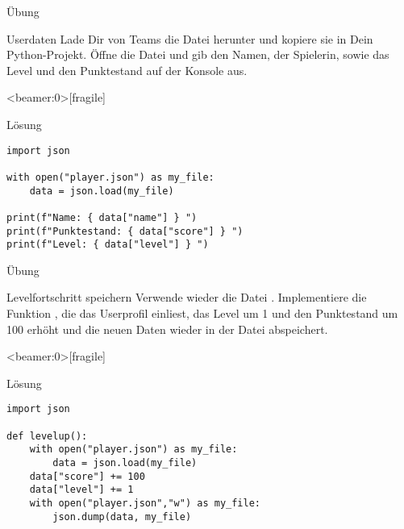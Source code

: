 \begin{frame}{Übung}
\begin{block}{Userdaten}
\vspace{2pt}
Lade Dir von Teams die Datei  herunter und kopiere sie in Dein Python-Projekt. 
Öffne die Datei und gib den Namen, der Spielerin, sowie das Level und den Punktestand auf der Konsole aus. 
\end{block}
\end{frame}



\begin{frame}<beamer:0>[fragile]{}
\begin{solutionblock}{Lösung}

\begin{verbatim}
import json 

with open("player.json") as my_file:
    data = json.load(my_file)

print(f"Name: { data["name"] } ")
print(f"Punktestand: { data["score"] } ")
print(f"Level: { data["level"] } ") 
\end{verbatim}
\end{solutionblock}
\end{frame}


\begin{frame}{Übung}
\begin{block}{Levelfortschritt speichern}
\vspace{2pt}
Verwende wieder die Datei . Implementiere die Funktion , die das Userprofil einliest, das Level um 1 und den Punktestand um 100 erhöht und die neuen Daten wieder in der Datei  abspeichert. 
\end{block}
\end{frame}


\begin{frame}<beamer:0>[fragile]{}
\begin{solutionblock}{Lösung}

\begin{verbatim}
import json 

def levelup(): 
    with open("player.json") as my_file:
        data = json.load(my_file)
    data["score"] += 100
    data["level"] += 1
    with open("player.json","w") as my_file: 
        json.dump(data, my_file)
\end{verbatim}
\end{solutionblock}
\end{frame}






